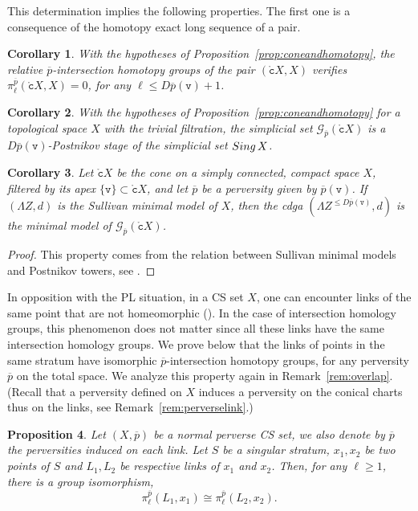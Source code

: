 \documentclass[a4paper,10pt,english,reqno]{amsart}
\theoremstyle{plain}
\newtheorem{proposition}{Proposition}[section]
\newtheorem{corollary}[proposition]{Corollary}
\theoremstyle{definition}
\theoremstyle{remark}
\numberwithin{equation}{section}
\newcommand{\propref}[1]{Proposition~\ref{#1}}
\newcommand{\remref}[1]{Remark~\ref{#1}}
\def\ov{\overline}
\def\crG{{\mathscr G}}
\def\tc{{\mathtt c}}
\def\tv{{\mathtt v}}
\def\sing{{\rm Sing}}
\def\rc{{\mathring{\tc}}}
\renewcommand\1{\hbox{\ding{192}}}
\renewcommand\2{\hbox{\ding{193}}}
\newcommand\3{\hbox{\ding{194}}}
\newcommand\4{\hbox{\ding{195}}}
\begin{document}
This determination implies the following properties. The first one is a consequence of the 
homotopy exact long sequence of a pair.
 
\begin{corollary}\label{cor:coneandhomology}
With the hypotheses of \propref{prop:coneandhomotopy},  the relative $\ov{p}$-intersection homotopy  groups of the pair $(\rc X,X)$ verifies
$
\pi_{\ell}^{\ov{p}}(\rc X,X)=0$,  for any $\ell \leq D\ov{p}(\tv)+1$.
%
\end{corollary}


\begin{corollary}\label{cor:gajerpostnikov}
With the hypotheses of \propref{prop:coneandhomotopy} for a topological space $X$ with the trivial filtration,
the simplicial set $\crG_{\ov{p}}(\rc X)$ is a 
$D\ov{p}(\tv)$-Postnikov stage  of the simplicial set $\sing \,X$. 
\end{corollary}

\begin{corollary}\label{cor:gajerconemodel}
Let $\rc X$ be the cone on a simply connected, compact space $X$, filtered by its apex
 $\{\tv\}\subset \rc X$, and let $\ov{p}$ be a perversity given by $\ov{p}(\tv)$.
If $(\Lambda Z,d)$ is the  Sullivan minimal model  of $X$, 
then the cdga $(\Lambda Z^{\leq D\ov{p}(\tv)},d)$ is the minimal model of $\crG_{\ov{p}}(\rc X)$.
\end{corollary}

\begin{proof}
This  property comes from the relation between Sullivan minimal models and Postnikov towers, see \cite{MR0646078}.
\end{proof}



 In opposition with the PL situation, in a  CS set $X$,
one can encounter  links of the same point that are not homeomorphic (\cite[Example 2.3.6]{FriedmanBook}). 
In the case of intersection homology groups, this phenomenon does not matter since all these
links have the same intersection homology groups. 
%
We prove below that the links of points in the same stratum have isomorphic $\ov{p}$-intersection homotopy groups, 
for any perversity $\ov{p}$ on the total space.
%
We analyze this property again in \remref{rem:overlap}.
%
(Recall  that a perversity defined on $X$ induces a perversity on the conical charts thus on the links, 
see  \remref{rem:perverselink}.)

\begin{proposition}\label{prop:LinkUnique}
Let $(X,\ov p)$ be a  normal perverse CS set, 
we also denote by $\ov{p}$ the perversities induced on each link. 
Let $S$ be a singular stratum,  $x_1,x_2$ be two points of $S$ and $L_1,L_2$ be respective links of $x_{1}$ and $x_{2}$.
%
Then, for any $\ell\geq 1$, there is a group isomorphism,
%
 $$
\pi_\ell^{\ov  p} (L_1,x_{1}) \cong \pi_\ell^{\ov  p} (L_2,x_{2}).
 $$
\end{proposition}
\end{document}
